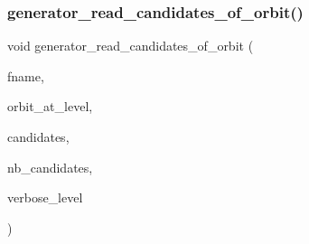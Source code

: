 \subsubsection{\texorpdfstring{generator\+\_\+read\+\_\+candidates\+\_\+of\+\_\+orbit()}{generator\_read\_candidates\_of\_orbit()}}
{\footnotesize\ttfamily void generator\+\_\+read\+\_\+candidates\+\_\+of\+\_\+orbit (\begin{DoxyParamCaption}\item[{\mbox{\hyperlink{galois_8h_ab6cc7b4aeb6ea31aba2b3fbfc83ff5e6}{B\+Y\+TE}} $\ast$}]{fname,  }\item[{\mbox{\hyperlink{galois_8h_a09fddde158a3a20bd2dcadb609de11dc}{I\+NT}}}]{orbit\+\_\+at\+\_\+level,  }\item[{\mbox{\hyperlink{galois_8h_a09fddde158a3a20bd2dcadb609de11dc}{I\+NT}} $\ast$\&}]{candidates,  }\item[{\mbox{\hyperlink{galois_8h_a09fddde158a3a20bd2dcadb609de11dc}{I\+NT}} \&}]{nb\+\_\+candidates,  }\item[{\mbox{\hyperlink{galois_8h_a09fddde158a3a20bd2dcadb609de11dc}{I\+NT}}}]{verbose\+\_\+level }\end{DoxyParamCaption})}

